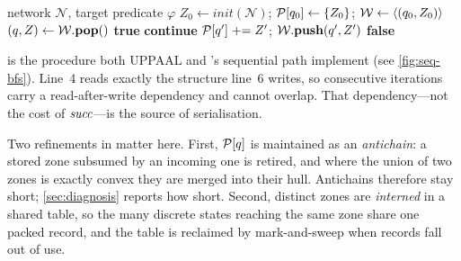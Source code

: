 \begin{algorithm}[t]
\caption{Sequential zone-graph BFS (UPPAAL-style)}\label{alg:seq}
\begin{algorithmic}[1]
\Require network $\mathcal{N}$, target predicate $\varphi$
\State $Z_0 \leftarrow \mathit{init}(\mathcal{N})$;\enspace
       $\mathcal{P}[q_0] \leftarrow \{Z_0\}$;\enspace
       $\mathcal{W} \leftarrow \langle (q_0, Z_0) \rangle$
\While{$\Wait \neq \emptyset$}
  \State $(q, Z) \leftarrow \mathcal{W}.\mathbf{pop}()$
     \Return \textbf{true} \EndIf
      \textbf{continue}
    \EndIf
    \State $\mathcal{P}[q'] \mathrel{+}= Z'$;\quad
           $\mathcal{W}.\mathbf{push}(q', Z')$
  \EndFor
\EndWhile
\Return \textbf{false}
\end{algorithmic}
\end{algorithm}

 is the procedure both UPPAAL and \tool{}'s sequential path
implement (see \cref{fig:seq-bfs}).  Line~4 reads exactly the structure line~6
writes, so consecutive iterations carry a read-after-write dependency and cannot
overlap.  That dependency---not the cost of $\mathit{succ}$---is the source of
serialisation.

Two refinements in \tool{} matter here.  First, $\mathcal{P}[q]$ is maintained as an
\emph{antichain}: a stored zone subsumed by an incoming one is retired, and where
the union of two zones is exactly convex they are merged into their hull.
Antichains therefore stay short; \cref{sec:diagnosis} reports how short.  Second,
distinct zones are \emph{interned} in a shared table, so the many discrete states
reaching the same zone share one packed record, and the table is reclaimed by
mark-and-sweep when records fall out of use.
